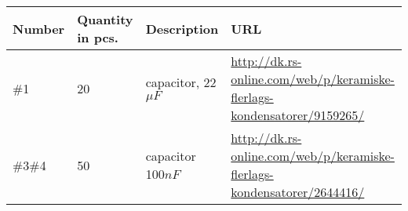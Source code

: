 \documentclass[11pt]{article}
\begin{document}
\begin{landscape}

\begin{table}[]
\centering

\begin{tabular}{|p{1.5cm}|p{3.5cm}|p{2.5cm} |p{11cm}|}

\hline
\textbf{Number} & \textbf{Quantity in pcs.} & \textbf{Description} & \textbf{URL}                                                                                                \\ \hline
\#1             & 20                        & capacitor, 22$\mu F$             & \url{http://dk.rs-online.com/web/p/keramiske-flerlags-kondensatorer/9159265/}                                     \\ \hline
\#3\#4            & 50                        & capacitor 100$nF$             & \url{http://dk.rs-online.com/web/p/keramiske-flerlags-kondensatorer/2644416/}                                     \\ \hline


\end{tabular}
\end{table}
\end{landscape}
\end{document}
